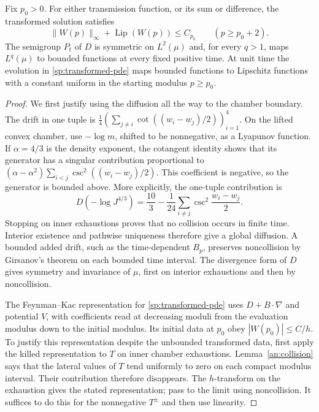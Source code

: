 \begin{lemma}\label{sp:smoothing}
Fix $p_0>0$.  For either transmission function, or its sum or difference,
the transformed solution satisfies
\begin{equation}\label{sp:uniform-smoothing}
 \|W(p)\|_\infty+\operatorname{Lip}(W(p))\le C_{p_0}
 \qquad(p\ge p_0+2).
\end{equation}
The semigroup $P_t$ of $D$ is symmetric on $L^2(\mu)$ and, for every
$q>1$, maps $L^q(\mu)$ to bounded functions at every fixed positive
time.  At unit time the evolution in \eqref{sp:transformed-pde} maps
bounded functions to Lipschitz functions with a constant uniform in
the starting modulus $p\ge p_0$.
\end{lemma}

\begin{proof}
We first justify using the diffusion all the way to the chamber
boundary.  The drift in one tuple is
$\frac14(\sum_{j\ne i}\cot((w_i-w_j)/2))_{i=1}^4$.
On the lifted convex chamber, use $-\log m$, shifted to be nonnegative,
as a Lyapunov function.  If $\alpha=4/3$ is the density exponent, the
cotangent identity shows that its generator has a singular contribution
proportional to $(\alpha-\alpha^2)\sum_{i<j}\csc^2((w_i-w_j)/2)$.
This coefficient is negative, so the generator is bounded above.
More explicitly, the one-tuple contribution is
\[
 D(-\log J^{4/3})=
 \frac{10}{3}-\frac1{24}\sum_{i\ne j}
                           \csc^2\frac{w_i-w_j}{2}.
\]
Stopping on inner exhaustions proves that no collision occurs in
finite time.  Interior existence and pathwise uniqueness therefore
give a global diffusion.  A bounded added drift, such as the
time-dependent $B_p$, preserves noncollision by Girsanov's theorem on
each bounded time interval.  The divergence form of $D$ gives symmetry
and invariance of $\mu$, first on interior exhaustions and then by
noncollision.

The Feynman--Kac representation for
\eqref{sp:transformed-pde} uses $D+B\cdot\nabla$ and potential $V$,
with coefficients read at decreasing moduli from the evaluation
modulus down to the initial modulus.  Its initial data at $p_0$ obey
$|W(p_0)|\le C/h$.  To justify this representation despite the
unbounded transformed data, first apply the killed representation to
$T$ on inner chamber exhaustions.  Lemma~\ref{an:collision} says that
the lateral values of $T$ tend uniformly to zero on each compact
modulus interval.  Their contribution therefore disappears.
The $h$-transform on the exhaustion gives the stated representation;
pass to the limit using noncollision.  It suffices to do this for the
nonnegative $T^\pm$ and then use linearity.


\end{proof}
